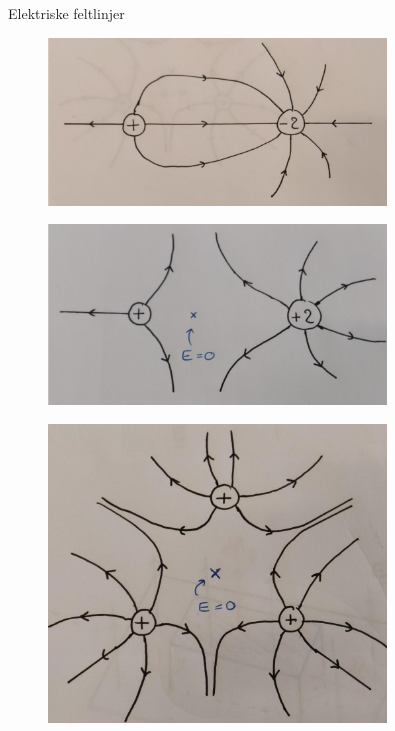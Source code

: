 \begin{opgave}{Elektriske feltlinjer}
    \opg 
    \begin{figure}[H]
        \centering
        \includegraphics[width=0.8\textwidth]{facit/figurer/elektro/elektro_opg2,1.jpg}
    \end{figure}
    \opg
    \begin{figure}[H]
        \centering
        \includegraphics[width=0.8\textwidth]{facit/figurer/elektro/elektro_opg2,2.jpg}
    \end{figure}
    \opg 
    \begin{figure}[H]
        \centering
        \includegraphics[width=0.8\textwidth]{facit/figurer/elektro/elektro_opg2,3.jpg}
    \end{figure}
\end{opgave}

